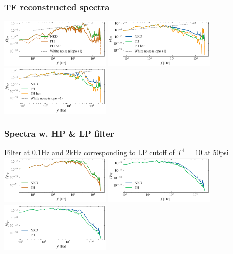 \documentclass[aspectratio=169,9pt]{beamer}
\begin{document}
\begin{frame}
    \frametitle{TF reconstructed spectra}
        \centering
        \includegraphics[width=0.4\textwidth]{sanity/50psi/PH-NKD/calib_spectra_50psi_nn_recon.pdf}
        \includegraphics[width=0.4\textwidth]{sanity/50psi/PH-NKD/calib_spectra_50psi_fn_recon.pdf}
        \includegraphics[width=0.4\textwidth]{sanity/50psi/PH-NKD/calib_spectra_50psi_an_recon.pdf}
\end{frame}

\begin{frame}
    \frametitle{Spectra w. HP \& LP filter}
    Filter at 0.1Hz and 2kHz corresponding to LP cutoff of $T^+=10$ at 50psi
        \centering
        \includegraphics[width=0.4\textwidth]{sanity/50psi/PH-NKD/calib_spectra_50psi_nn_filt.pdf}
        \includegraphics[width=0.4\textwidth]{sanity/50psi/PH-NKD/calib_spectra_50psi_fn_filt.pdf}
        \includegraphics[width=0.4\textwidth]{sanity/50psi/PH-NKD/calib_spectra_50psi_an_filt.pdf}
\end{frame}
\end{document}
